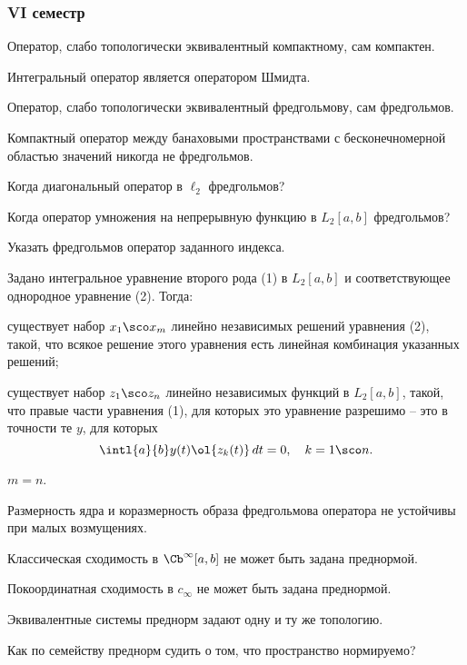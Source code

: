 \documentclass[a4paper]{article}
\begin{document}
\subsubsection*{VI семестр}

\begin{nums}{-1}
\item Оператор, слабо топологически эквивалентный компактному, сам компактен.
\item Интегральный оператор является оператором Шмидта.

\item Оператор, слабо топологически эквивалентный фредгольмову, сам фредгольмов.
\item Компактный оператор между банаховыми пространствами с бесконечномерной областью
значений никогда не фредгольмов.

\item Когда диагональный оператор в $\ell_2$ фредгольмов?
\item Когда оператор умножения на непрерывную функцию в $L_2[a,b]$ фредгольмов?

\item Указать фредгольмов оператор заданного индекса.
\item Задано интегральное уравнение второго рода (1) в $L_2[a,b]$
и соответствующее однородное уравнение (2). Тогда:

\begin{items}{-1}
\item существует набор $x_1\sco x_m$ линейно независимых решений
уравнения (2), такой, что всякое решение этого уравнения есть линейная комбинация указанных
решений;
\item существует набор $z_1\sco z_n$ линейно независимых функций в $L_2[a,b]$,
такой, что правые части уравнения (1), для которых это уравнение разрешимо -- это в точности те
$y$, для которых
$$\intl{a}{b} y(t)\ol{z_k(t)}\,dt=0, \quad k=1\sco n.$$
\item $m=n$.
\end{items}
\item Размерность ядра и коразмерность образа фредгольмова оператора не устойчивы
при малых возмущениях.

\item Классическая сходимость в $\Cb^\infty[a,b]$ не может быть задана
преднормой.
\item Покоординатная сходимость в $c_\infty$ не может быть задана преднормой.

\item Эквивалентные системы преднорм задают одну и ту же топологию.
\item Как по семейству преднорм судить о том, что пространство нормируемо?


\end{nums}
\end{document}
